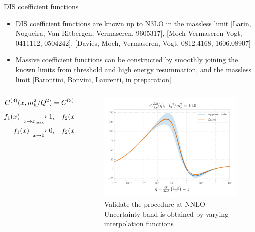 \documentclass[8pt,t]{beamer}
\begin{document}
\begin{frame}{DIS coefficient functions}
  \begin{itemize}
    \item DIS coefficient functions are known up to N3LO in the massless limit {\color{gray}\footnotesize [Larin, Nogueira, Van Ritbergen, Vermaseren, 9605317], [Moch Vermaseren Vogt, 0411112, 0504242], [Davies, Moch, Vermaseren, Vogt, 0812.4168, 1606.08907]}
    \item Massive coefficient functions can be constructed by smoothly joining the known limits from threshold and high energy resummation, and the massless limit {\color{gray}\footnotesize [Barontini, Bonvini, Laurenti, in preparation]}
  \end{itemize}

  \vspace*{-0.5em}
  \begin{columns}
    \begin{column}{0.49\textwidth}
      \begin{equation*}
        C^{(3)}(x,m_h^2/Q^2) = C^{(3),{\rm thr}}(x,m_h^2/Q^2) f_1(x) + C^{(3),{\rm asy}}(x,m_h^2/Q^2) f_2(x)
      \end{equation*}
      \begin{align*}
        \begin{split}
          f_1(x) \xrightarrow[x \to x_{\rm max}]{} 1, & \quad  f_2(x) \xrightarrow[x \to x_{\rm max}]{} 0 \\
          f_1(x) \xrightarrow[x \to 0]{} 0, & \quad  f_2(x) \xrightarrow[x \to 0]{} 1
        \end{split}
      \end{align*}
    \end{column}
    \begin{column}{0.49\textwidth}

      \vspace*{2.5em}
      \begin{figure}
        \centering
        \includegraphics[width=.9\textwidth]{dis_coeff_n3lo.pdf}
        \caption*{
          Validate the procedure at NNLO \\
          Uncertainty band is obtained by varying interpolation functions
        }
      \end{figure}
    \end{column}
  \end{columns}
\end{frame}
\end{document}
